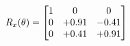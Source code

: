 \documentclass[preview]{standalone}
\begin{document}
\begin{align*}
\special{dvisvgm:raw <g id='unique000'>}R_{x}(\theta) = \begin{bmatrix}1 & 0 & 0 \\0 & +0.91 & -0.41 \\0 & +0.41 & +0.91\end{bmatrix}\special{dvisvgm:raw </g>}
\end{align*}
\end{document}
